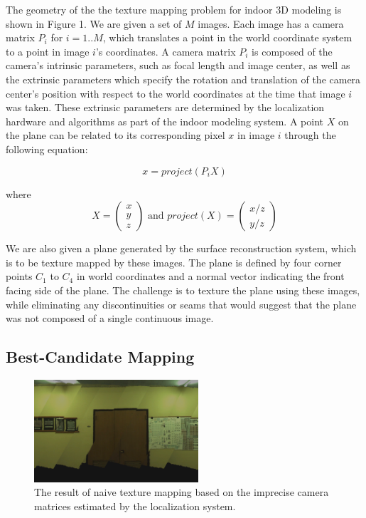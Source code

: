 \documentclass[runningheads]{llncs}
\begin{document}
The geometry of the the texture mapping problem for indoor 3D modeling is shown in Figure 1. We are given a set of $M$ images. Each image has a camera matrix $P_i$ for $i=1..M$, which translates a point in the world coordinate system to a point in image $i$'s coordinates. A camera matrix $P_i$ is composed of the camera's intrinsic parameters, such as focal length and image center, as well as the extrinsic parameters which specify the rotation and translation of the camera center's position with respect to the world coordinates at the time that image $i$ was taken. These extrinsic parameters are determined by the localization hardware and algorithms as part of the indoor modeling system. A point $X$ on the plane can be related to its corresponding pixel $x$ in image $i$ through the following equation: 

\[
x=project(P_iX)
\]

where 
\[X = \begin{pmatrix} x \\ y \\ z \end{pmatrix} \textrm{ and } project(X) = \begin{pmatrix} x/z \\ y/z \end{pmatrix}
\]

We are also given a plane generated by the surface reconstruction system, which is to be texture mapped by these images. The plane is defined by four corner points $C_1$ to $C_4$ in world coordinates and a normal vector indicating the front facing side of the plane. The challenge is to texture the plane using these images, while eliminating any discontinuities or seams that would suggest that the plane was not composed of a single continuous image. 

\subsection{Best-Candidate Mapping}

\begin{figure}
\centering
\includegraphics[height=1.5in]{naive.png}
\caption{The result of naive texture mapping based on the imprecise camera matrices estimated by the localization system.}
\label{fig:naive}
\end{figure}
\end{document}
